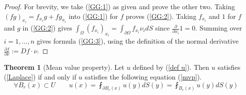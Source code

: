 \documentclass[titlepage]{article}
\renewcommand{\;}{\:\:\:} %
\newcommand{\f}[2]{\frac{#1}{#2}} %
\newcommand{\p}{\partial} %
\theoremstyle{definition}
\theoremstyle{theorem}
\newtheorem*{theorem}{Theorem}
\theoremstyle{remark}
\theoremstyle{lemma}
\begin{document}
\begin{proof}
For brevity, we take (\ref{GG:1}) as given and prove the other two. Taking $(fg)_{x_i} = f_{x_i}g + fg_{x_i}$ into (\ref{GG:1}) for $f$ proves (\ref{GG:2}). Taking $f_{x_i}$ and $1$ for $f$ and $g$ in (\ref{GG:2}) gives $\int_\Omega (f_{x_i})_{x_i} = \int_{\p \Omega} f_{x_i} \nu_i dS$ since $\f{\p}{\p x_i} 1 = 0$. Summing over $i=1,...,n$ gives formula (\ref{GG:3}), using the definition of the normal derivative $\f{\p f}{\p \nu} := Df \cdot \nu$.
\end{proof}
\begin{theorem}[Mean value property]
Let $u$ defined by (\ref{def u}). Then $u$ satisfies (\ref{Laplace}) if and only if $u$ satisfies the following equation (\ref{mvp}).
\begin{equation} \label{mvp}
    \forall B_r(x) \subset U \qquad
    u(x) = \fint_{\p B_r(x)} u(y) dS(y) = \fint_{B_r(x)} u(y) dS(y)
\end{equation}
\end{theorem}
\end{document}
